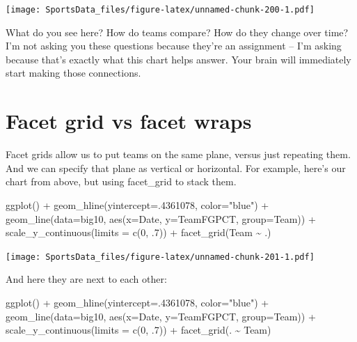 \documentclass[
]{book}
\newenvironment{Shaded}{\begin{snugshade}}{\end{snugshade}}
\newcommand{\AttributeTok}[1]{\textcolor[rgb]{0.77,0.63,0.00}{#1}}
\newcommand{\DecValTok}[1]{\textcolor[rgb]{0.00,0.00,0.81}{#1}}
\newcommand{\FunctionTok}[1]{\textcolor[rgb]{0.00,0.00,0.00}{#1}}
\newcommand{\NormalTok}[1]{#1}
\newcommand{\SpecialCharTok}[1]{\textcolor[rgb]{0.00,0.00,0.00}{#1}}
\newcommand{\StringTok}[1]{\textcolor[rgb]{0.31,0.60,0.02}{#1}}
\begin{document}
\texttt{[image: SportsData\_files/figure-latex/unnamed-chunk-200-1.pdf]}

What do you see here? How do teams compare? How do they change over time? I'm not asking you these questions because they're an assignment -- I'm asking because that's exactly what this chart helps answer. Your brain will immediately start making those connections.

\hypertarget{facet-grid-vs-facet-wraps}{%
\section{Facet grid vs facet wraps}\label{facet-grid-vs-facet-wraps}}

Facet grids allow us to put teams on the same plane, versus just repeating them. And we can specify that plane as vertical or horizontal. For example, here's our chart from above, but using facet\_grid to stack them.

\begin{Shaded}
\begin{Highlighting}[]
\FunctionTok{ggplot}\NormalTok{() }\SpecialCharTok{+} 
  \FunctionTok{geom\_hline}\NormalTok{(}\AttributeTok{yintercept=}\NormalTok{.}\DecValTok{4361078}\NormalTok{, }\AttributeTok{color=}\StringTok{"blue"}\NormalTok{) }\SpecialCharTok{+} 
  \FunctionTok{geom\_line}\NormalTok{(}\AttributeTok{data=}\NormalTok{big10, }\FunctionTok{aes}\NormalTok{(}\AttributeTok{x=}\NormalTok{Date, }\AttributeTok{y=}\NormalTok{TeamFGPCT, }\AttributeTok{group=}\NormalTok{Team)) }\SpecialCharTok{+} 
  \FunctionTok{scale\_y\_continuous}\NormalTok{(}\AttributeTok{limits =} \FunctionTok{c}\NormalTok{(}\DecValTok{0}\NormalTok{, .}\DecValTok{7}\NormalTok{)) }\SpecialCharTok{+} 
  \FunctionTok{facet\_grid}\NormalTok{(Team }\SpecialCharTok{\textasciitilde{}}\NormalTok{ .)}
\end{Highlighting}
\end{Shaded}

\texttt{[image: SportsData\_files/figure-latex/unnamed-chunk-201-1.pdf]}

And here they are next to each other:

\begin{Shaded}
\begin{Highlighting}[]
\FunctionTok{ggplot}\NormalTok{() }\SpecialCharTok{+} 
  \FunctionTok{geom\_hline}\NormalTok{(}\AttributeTok{yintercept=}\NormalTok{.}\DecValTok{4361078}\NormalTok{, }\AttributeTok{color=}\StringTok{"blue"}\NormalTok{) }\SpecialCharTok{+} 
  \FunctionTok{geom\_line}\NormalTok{(}\AttributeTok{data=}\NormalTok{big10, }\FunctionTok{aes}\NormalTok{(}\AttributeTok{x=}\NormalTok{Date, }\AttributeTok{y=}\NormalTok{TeamFGPCT, }\AttributeTok{group=}\NormalTok{Team)) }\SpecialCharTok{+} 
  \FunctionTok{scale\_y\_continuous}\NormalTok{(}\AttributeTok{limits =} \FunctionTok{c}\NormalTok{(}\DecValTok{0}\NormalTok{, .}\DecValTok{7}\NormalTok{)) }\SpecialCharTok{+} 
  \FunctionTok{facet\_grid}\NormalTok{(. }\SpecialCharTok{\textasciitilde{}}\NormalTok{ Team)}
\end{Highlighting}
\end{Shaded}
\end{document}
